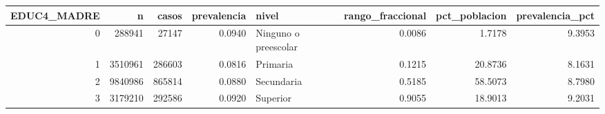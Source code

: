 \begin{tabular}{rrrrlrrr}
\toprule
EDUC4\_MADRE & n & casos & prevalencia & nivel & rango\_fraccional & pct\_poblacion & prevalencia\_pct \\
\midrule
0 & 288941 & 27147 & 0.0940 & Ninguno o preescolar & 0.0086 & 1.7178 & 9.3953 \\
1 & 3510961 & 286603 & 0.0816 & Primaria & 0.1215 & 20.8736 & 8.1631 \\
2 & 9840986 & 865814 & 0.0880 & Secundaria & 0.5185 & 58.5073 & 8.7980 \\
3 & 3179210 & 292586 & 0.0920 & Superior & 0.9055 & 18.9013 & 9.2031 \\
\bottomrule
\end{tabular}
